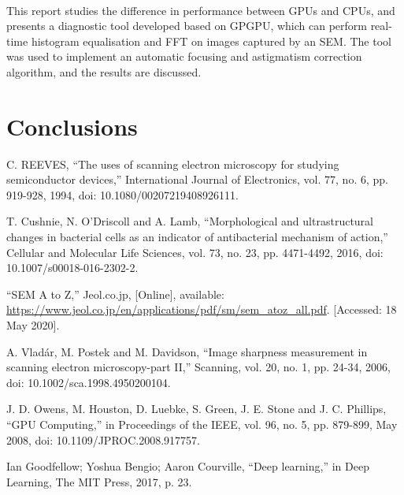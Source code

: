 \documentclass[12pt, twocolumn]{report}
\begin{document}
\paragraph{}
This report studies the difference in performance between GPUs and CPUs, and presents a diagnostic tool developed based on GPGPU, which can perform real-time histogram equalisation and FFT on images captured by an SEM. The tool was used to implement an automatic focusing and astigmatism correction algorithm, and the results are discussed.

\section{Conclusions}

\begin{thebibliography}{00}
    C. REEVES, ``The uses of scanning electron microscopy for studying semiconductor devices,'' International Journal of Electronics, vol. 77, no. 6, pp. 919-928, 1994, doi: 10.1080/00207219408926111.

    T. Cushnie, N. O’Driscoll and A. Lamb, ``Morphological and ultrastructural changes in bacterial cells as an indicator of antibacterial mechanism of action,'' Cellular and Molecular Life Sciences, vol. 73, no. 23, pp. 4471-4492, 2016, doi: 10.1007/s00018-016-2302-2.

    ``SEM A to Z,'' Jeol.co.jp, [Online], available: \url{https://www.jeol.co.jp/en/applications/pdf/sm/sem_atoz_all.pdf}. [Accessed: 18 May 2020].

    A. Vladár, M. Postek and M. Davidson, ``Image sharpness measurement in scanning electron microscopy-part II,'' Scanning, vol. 20, no. 1, pp. 24-34, 2006, doi: 10.1002/sca.1998.4950200104.

    J. D. Owens, M. Houston, D. Luebke, S. Green, J. E. Stone and J. C. Phillips, ``GPU Computing,'' in Proceedings of the IEEE, vol. 96, no. 5, pp. 879-899, May 2008, doi: 10.1109/JPROC.2008.917757.

    Ian Goodfellow; Yoshua Bengio; Aaron Courville, ``Deep learning,'' in Deep Learning, The MIT Press, 2017, p. 23.
\end{thebibliography}
\end{document}
